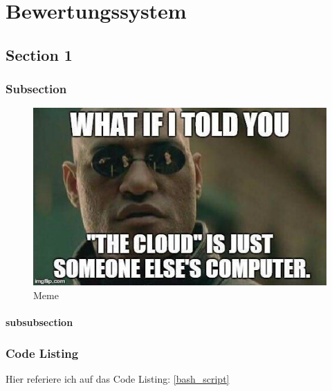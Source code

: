 \chapter{Bewertungssystem} \label{sec:bewertungssystem}
\pagestyle{SchuelerA} %
\section{Section 1}
\lipsum[3-4]
\subsection{Subsection}
\lipsum[2-3]
\begin{figure}[th!]
	\includegraphics[width=\textwidth]{img/cloud_meme.jpg}
	\caption{Meme}
\end{figure}
\subsubsection{subsubsection}
	\lipsum[1-2]
\newpage
\subsection{Code Listing}
	Hier referiere ich auf das Code Listing: \ref{bash_script}
	